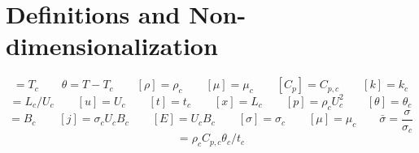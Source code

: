 \documentclass[11pt]{article}
\begin{document}
\section{Definitions and Non-dimensionalization}
\begin{equation}
	[T] = T_c \qquad
	\theta = T-T_c \qquad
	[\rho] = \rho_c \qquad
	[\mu] = \mu_c \qquad
	[C_p] = C_{p,c} \qquad
	[k] = k_c
\end{equation}
\begin{equation}
	[t_c] = L_c/U_c \qquad
	[u] = U_c \qquad
	[t] = t_c \qquad
	[x] = L_c \qquad
	[p] = \rho_c U_c^2 \qquad
	[\theta] = \theta_c
\end{equation}
\begin{equation}
	[B] = B_c  \qquad
	[j] = \sigma_c U_c B_c \qquad
	[E] = U_c B_c \qquad
	[\sigma] = \sigma_c \qquad
	[\mu] = \mu_c \qquad
	\bar{\sigma} = \frac{\sigma}{\sigma_c}
\end{equation}
\begin{equation}
	[\dot{Q}] = \rho_c C_{p,c} \theta_c / t_c
\end{equation}
\end{document}
